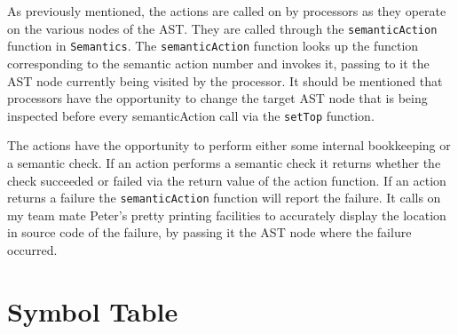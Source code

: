 \documentclass[oneside]{amsart}
\theoremstyle{definition}
\theoremstyle{remark}
\numberwithin{equation}{section}
\begin{document}
As previously mentioned, the actions are called on by processors as they operate
on the various nodes of the AST. They are called through the
\texttt{semanticAction} function in \texttt{Semantics}. The
\texttt{semanticAction} function looks up the function corresponding to the
semantic action number and invokes it, passing to it the AST node currently
being visited by the processor. It should be mentioned that processors have the
opportunity to change the target AST node that is being inspected before every
semanticAction call via the \texttt{setTop} function.

The actions have the opportunity to perform either some internal bookkeeping or
a semantic check. If an action performs a semantic check it returns whether the
check succeeded or failed via the return value of the action function. If an
action returns a failure the \texttt{semanticAction} function will report the
failure. It calls on my team mate Peter's pretty printing facilities to
accurately display the location in source code of the failure, by passing it the
AST node where the failure occurred.

\section{Symbol Table}

\end{document}
